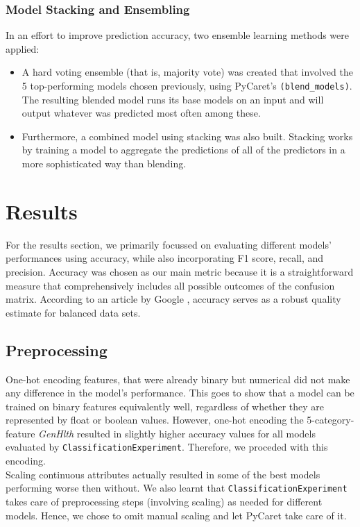 \documentclass[a4paper,12pt]{article}
\begin{document}
\subsubsection{Model Stacking and Ensembling}
In an effort to improve prediction accuracy, two ensemble learning methods were applied:
\begin{itemize}
    \item A hard voting ensemble (that is, majority vote) was created that involved 
    the 5 top-performing models chosen previously, using PyCaret's \texttt{(blend\_models)}. 
    The resulting blended model runs its base models on an input
    and will output whatever was predicted most often among these.
    \item Furthermore, a combined model using stacking was also built. 
    Stacking works by training a model to aggregate the predictions of all of the predictors in a more
    sophisticated way than blending.
\end{itemize} 

\section{Results}
For the results section, we primarily focussed on evaluating different models' performances using accuracy, while also
incorporating F1 score, recall, and precision. Accuracy was chosen as our main metric because it is a 
straightforward measure that comprehensively includes all possible outcomes of the confusion matrix. 
According to an article by Google \cite{Google}, accuracy serves as a robust quality estimate for balanced data sets.

\subsection{Preprocessing}
One-hot encoding features, that were already binary but numerical did not make any difference in the model's
performance. This goes to show that a model can be trained on binary features equivalently well, regardless
of whether they are represented by float or boolean values. However, one-hot encoding the 5-category-feature
\textit{GenHlth} resulted in slightly higher accuracy values for all models evaluated by \texttt{ClassificationExperiment}.
Therefore, we proceded with this encoding.
\\
Scaling continuous attributes actually resulted in some of the best models performing worse then without.
We also learnt that \texttt{ClassificationExperiment} takes care of preprocessing steps (involving scaling)
as needed for different models. Hence, we chose to omit manual scaling and let PyCaret take care of it.
\end{document}
